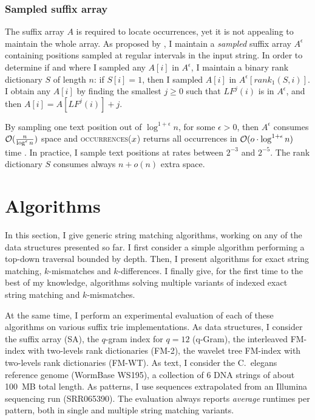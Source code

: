 \subsubsection{Sampled suffix array}

The suffix array $A$ is required to locate occurrences, yet it is not appealing to maintain the whole array.
As proposed by \citeauthor{Ferragina2000}, I maintain a \emph{sampled} suffix array $A^{\epsilon}$ containing positions sampled at regular intervals in the input string.
In order to determine if and where I sampled any $A[i]$ in $A^{\epsilon}$, I maintain a binary rank dictionary $S$ of length $n$: if $S[i]=1$, then I sampled $A[i]$ in $A^{\epsilon}[rank_1(S,i)]$.
I obtain any $A[i]$ by finding the smallest $j \geq 0$ such that $LF^j(i)$ is in $A^{\epsilon}$, and then $A[i] = A[LF^j(i)] + j$.

By sampling one text position out of $\log^{1+\epsilon}{n}$, for some $\epsilon > 0$, then $A^{\epsilon}$ consumes $\mathcal{O}(\frac{n}{\log^{\epsilon}{n}})$ space and \textsc{occurrences}($x$) returns all occurrences in $\mathcal{O}(o \cdot \log^{1+\epsilon}{n})$ time \citep{Ferragina2000}.
In practice, I sample text positions at rates between $2^{-3}$ and $2^{-5}$.
The rank dictionary $S$ consumes always $n+o(n)$ extra space.

\section{Algorithms}
\label{sec:index:algo}

In this section, I give generic string matching algorithms, working on any of the data structures presented so far.
I first consider a simple algorithm performing a top-down traversal bounded by depth.
Then, I present algorithms for exact string matching, $k$-mismatches and $k$-differences.
I finally give, for the first time to the best of my knowledge, algorithms solving multiple variants of indexed exact string matching and $k$-mismatches.

At the same time, I perform an experimental evaluation of each of these algorithms on various suffix trie implementations.
As data structures, I consider the suffix array (SA), the $q$-gram index for $q=12$ (q-Gram), the interleaved FM-index with two-levels rank dictionaries (FM-2), the wavelet tree FM-index with two-levels rank dictionaries (FM-WT).
As text, I consider the C.~elegans reference genome (WormBase WS195), \ie a collection of 6 DNA strings of about 100~MB total length.
As patterns, I use sequences extrapolated from an Illumina sequencing run (SRR065390).
The evaluation always reports \emph{average} runtimes per pattern, both in single and multiple string matching variants.

